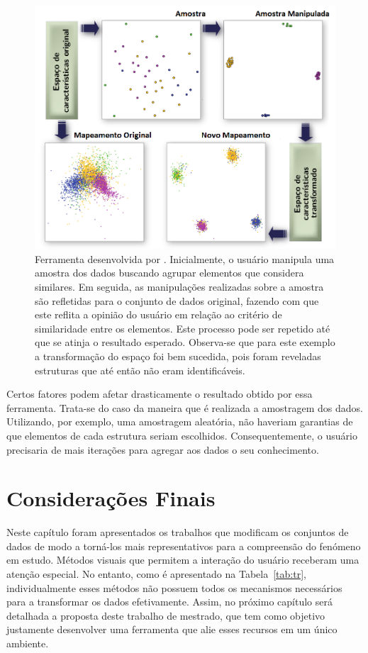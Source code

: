 \begin{figure}[h!]
    \centering
    \includegraphics[width=16cm]{images/ud.png}
    \caption[Ferramenta desenvolvida por \cite{Gladys2013}]
    {Ferramenta desenvolvida por \cite{Gladys2013}.
    Inicialmente, o usuário manipula uma amostra dos
    dados buscando  agrupar elementos que considera
    similares.  Em seguida, as manipulações realizadas
    sobre a amostra são refletidas para o conjunto de
    dados original, fazendo com que este reflita a
    opinião do usuário em relação ao critério de
    similaridade entre os elementos. Este processo pode
    ser repetido até que se atinja o resultado esperado.
    Observa-se que para este exemplo a transformação do
    espaço foi bem sucedida, pois foram reveladas
    estruturas que até então não eram identificáveis.}
    \label{fig:ud}
\end{figure}

Certos fatores podem afetar drasticamente o resultado obtido
por essa ferramenta. Trata-se do caso da maneira que é realizada 
a amostragem dos dados. Utilizando, por exemplo, uma
amostragem aleatória, não haveriam garantias de que
elementos de cada estrutura seriam escolhidos.
Consequentemente, o usuário precisaria de mais iterações
para agregar aos dados o seu conhecimento.

\section{Considerações Finais}

Neste capítulo foram apresentados os trabalhos que modificam
os conjuntos de dados de modo a torná-los mais
representativos para a compreensão do fenómeno em estudo.
Métodos visuais que permitem a interação do usuário
receberam uma atenção especial. No entanto, como é
apresentado na Tabela~\ref{tab:tr}, individualmente esses
métodos não possuem todos os mecanismos necessários para a
transformar os dados efetivamente. Assim, no próximo
capítulo será detalhada a proposta deste trabalho de
mestrado, que tem como objetivo justamente desenvolver uma
ferramenta que alie esses recursos em um único ambiente.

